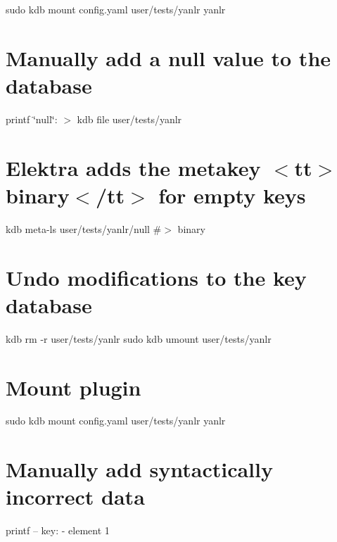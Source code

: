 sudo kdb mount config.\+yaml user/tests/yanlr yanlr\hypertarget{autotoc_md861_autotoc_md884}{}\section{Manually add a null value to the database}\label{autotoc_md861_autotoc_md884}
printf \textquotesingle{}\char`\"{}null\char`\"{}\+:\textquotesingle{} $>$ {\ttfamily kdb file user/tests/yanlr}\hypertarget{autotoc_md861_autotoc_md885}{}\section{Elektra adds the metakey $<$tt$>$binary$<$/tt$>$ for empty keys}\label{autotoc_md861_autotoc_md885}
kdb meta-\/ls user/tests/yanlr/null \#$>$ binary\hypertarget{autotoc_md861_autotoc_md886}{}\section{Undo modifications to the key database}\label{autotoc_md861_autotoc_md886}
kdb rm -\/r user/tests/yanlr sudo kdb umount user/tests/yanlr 
\begin{DoxyCode}{0}
\end{DoxyCode}
 \hypertarget{autotoc_md861_autotoc_md887}{}\section{Mount plugin}\label{autotoc_md861_autotoc_md887}
sudo kdb mount config.\+yaml user/tests/yanlr yanlr\hypertarget{autotoc_md861_autotoc_md888}{}\section{Manually add syntactically incorrect data}\label{autotoc_md861_autotoc_md888}
printf -- \textquotesingle{}key\+: -\/ element 1~\newline
